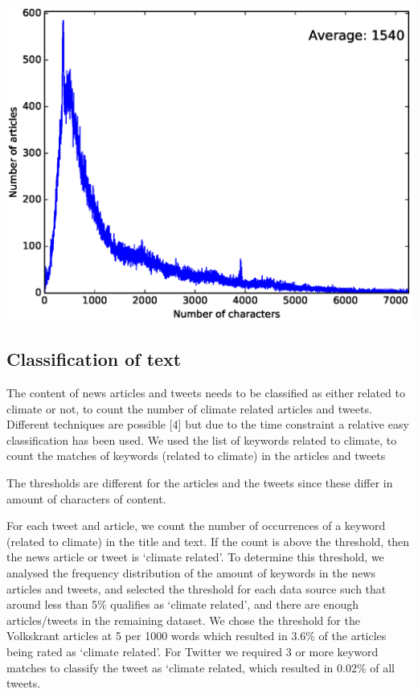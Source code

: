 \documentclass[paper=a4, fontsize=9px]{scrartcl} %
\numberwithin{equation}{section} %
\numberwithin{figure}{section} %
\numberwithin{table}{section} %
\newenvironment{Figure}
{\par\medskip\noindent\minipage{\linewidth}}
{\endminipage\par\medskip}
\begin{document}
\begin{multicols}{2}
\begin{Figure}
	\includegraphics[width=\textwidth]{img/articles_characters}
	\label{fig:9}
\end{Figure}



\subsection{Classification of text}

The content of news articles and tweets needs to be classified as either related to climate or not, to count the number of climate related articles and tweets. Different techniques are possible [4] but due to the time constraint a relative easy classification has been used. We used the list of keywords related to climate, to count the matches of keywords (related to climate) in the articles and tweets

The thresholds are different for the articles and the tweets since these differ in amount of characters of content. 

For each tweet and article, we count the number of occurrences of a keyword (related to climate) in the title and text. If the count is above the threshold, then the news article or tweet is `climate related’. To determine this threshold, we analysed the frequency distribution of the amount of keywords in the news articles and tweets, and selected the threshold for each data source such that around less than 5\% qualifies as `climate related’, and there are enough articles/tweets in the remaining dataset. We chose the threshold for the Volkskrant articles at 5 per 1000 words which resulted in 3.6\% of the articles being rated as `climate related'. For Twitter we required 3 or more keyword matches to classify the tweet as `climate related, which resulted in 0.02\% of all tweets.


\end{multicols}
\end{document}
